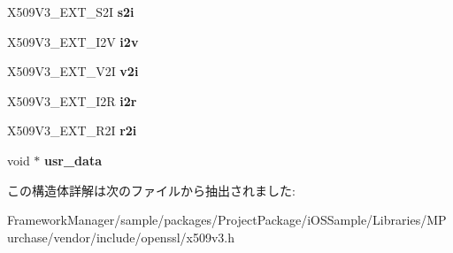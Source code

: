 \begin{DoxyCompactItemize}
\item 
\hypertarget{structv3__ext__method_afe843df7c11d126f43aa7ed05538d572}{}X509\+V3\+\_\+\+E\+X\+T\+\_\+\+S2\+I {\bfseries s2i}\label{structv3__ext__method_afe843df7c11d126f43aa7ed05538d572}

\item 
\hypertarget{structv3__ext__method_a93b334b99719e183e3d16ea9c7c2547c}{}X509\+V3\+\_\+\+E\+X\+T\+\_\+\+I2\+V {\bfseries i2v}\label{structv3__ext__method_a93b334b99719e183e3d16ea9c7c2547c}

\item 
\hypertarget{structv3__ext__method_ab0699c47258c61200f7189fe888f7aab}{}X509\+V3\+\_\+\+E\+X\+T\+\_\+\+V2\+I {\bfseries v2i}\label{structv3__ext__method_ab0699c47258c61200f7189fe888f7aab}

\item 
\hypertarget{structv3__ext__method_aa61cb3a7c7bfe70f813857485e9a4e02}{}X509\+V3\+\_\+\+E\+X\+T\+\_\+\+I2\+R {\bfseries i2r}\label{structv3__ext__method_aa61cb3a7c7bfe70f813857485e9a4e02}

\item 
\hypertarget{structv3__ext__method_a58e1a54a66185f358d7859e771a9a39a}{}X509\+V3\+\_\+\+E\+X\+T\+\_\+\+R2\+I {\bfseries r2i}\label{structv3__ext__method_a58e1a54a66185f358d7859e771a9a39a}

\item 
\hypertarget{structv3__ext__method_a9a1b284354290f1f8d5d375a194c75e6}{}void $\ast$ {\bfseries usr\+\_\+data}\label{structv3__ext__method_a9a1b284354290f1f8d5d375a194c75e6}

\end{DoxyCompactItemize}


この構造体詳解は次のファイルから抽出されました\+:\begin{DoxyCompactItemize}
\item 
Framework\+Manager/sample/packages/\+Project\+Package/i\+O\+S\+Sample/\+Libraries/\+M\+Purchase/vendor/include/openssl/x509v3.\+h\end{DoxyCompactItemize}
